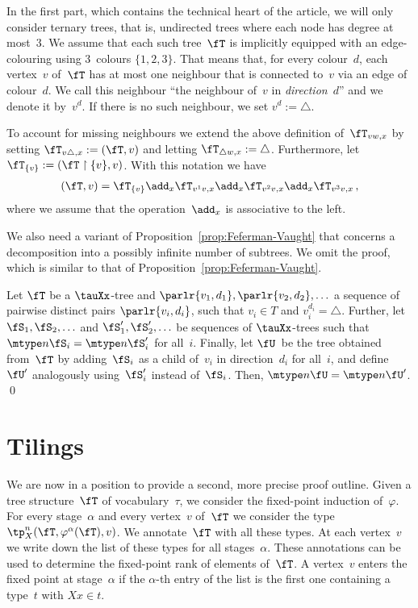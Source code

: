 \documentclass{LMCS}
\begin{document}
In the first part, which contains the technical heart of the article,
we will only consider ternary trees, that is,
undirected trees where each node has degree at most~$3$.
We assume that each such tree~$\fT$ is implicitly equipped
with an edge-colouring using $3$~colours $\{1,2,3\}$.
That means that, for every colour~$d$,
each vertex~$v$ of~$\fT$ has at most one neighbour
that is connected to~$v$ via an edge of colour~$d$.
We call this neighbour ``the neighbour of~$v$ in \emph{direction}~$d$''
and we denote it by~$v^d$.
If there is no such neighbour, we set $v^d := \triangle$.

To account for missing neighbours we extend the above
definition of~$\fT_{vw,x}$
by setting $\fT_{v\triangle,x} := (\fT,v)$
and letting $\fT_{\triangle w,x} := \triangle$.
Furthermore, let $\fT_{\{v\}} := (\fT \restriction \{v\},v)$.
With this notation we have
\begin{align*}
  (\fT,v) = \fT_{\{v\}}
  \add_x \fT_{v^1v,x} \add_x \fT_{v^2v,x} \add_x \fT_{v^3v,x}\,,
\end{align*}
where we assume that the operation~$\add_x$ is associative to the left.

We also need a variant of Proposition~\ref{prop:Feferman-Vaught}
that concerns a decomposition into a possibly infinite number of subtrees.
We omit the proof, which is similar to that of Proposition~\ref{prop:Feferman-Vaught}.
\begin{prop}\label{prop:Feferman-Vaught II}
Let $\fT$ be a $\tauXx$-tree and $\parlr{v_1,d_1},\parlr{v_2,d_2},\ldots$
a sequence of pairwise distinct pairs $\parlr{v_i,d_i}$,
such that $v_i\in T$ and $v_i^{d_i}=\triangle$.
Further, let $\fS_1,\fS_2,\ldots$ and $\fS'_1,\fS'_2,\ldots$
be sequences of $\tauXx$-trees
such that $\mtype n{\fS_i}=\mtype n{\fS'_i}$ for all~$i$.
Finally, let $\fU$~be the tree obtained from~$\fT$
by adding~$\fS_i$ as a child of~$v_i$
in direction~$d_i$ for all~$i$,
and define~$\fU'$ analogously using~$\fS'_i$ instead of~$\fS_i$.
Then, $\mtype n{\fU}=\mtype n{\fU'}$.
\qed\end{prop}


\section{Tilings}
\label{sect:tilings}


We are now in a position to provide a second, more precise proof outline.
Given a tree structure~$\fT$ of vocabulary~$\tau$,
we consider the fixed-point induction of~$\varphi$.
For every stage~$\alpha$ and every vertex~$v$ of~$\fT$
we consider the type $\tp^n_X(\fT,\varphi^\alpha(\fT),v)$.
We annotate~$\fT$ with all these types.
At each vertex~$v$ we write down the list of these types for all stages~$\alpha$.
These annotations can be used to determine the fixed-point rank of elements of~$\fT$.
A vertex~$v$ enters the fixed point at stage~$\alpha$ if the $\alpha$-th entry
of the list is the first one containing a type~$t$ with $Xx \in t$.
\end{document}
